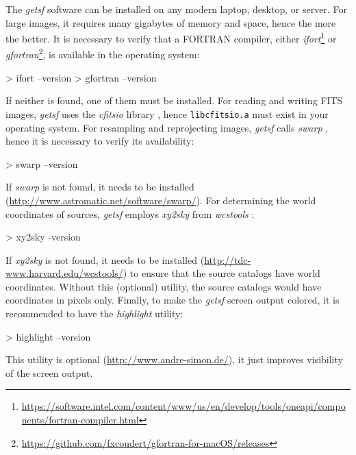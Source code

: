 \documentclass[a4paper,10pt]{article}
\begin{document}
The \textsl{getsf} software can be installed on any modern laptop, desktop, or server. For large images, it requires many gigabytes
of memory and space, hence the more the better. It is necessary to verify that a FORTRAN compiler, either
\textsl{ifort}\footnote{\url{https://software.intel.com/content/www/us/en/develop/tools/oneapi/components/fortran-compiler.html}}
or \textsl{gfortran}\footnote{\url{https://github.com/fxcoudert/gfortran-for-macOS/releases}}, is available in the operating system:
\begin{verbnobox}[\mbox{}\small] 
> ifort --version
> gfortran --version
\end{verbnobox} 
If neither is found, one of them must be installed. For reading and writing FITS images, \textsl{getsf} uses the \textsl{cfitsio}
library \citep{Pence1999}, hence \verb!libcfitsio.a! must exist in your operating system. For resampling and reprojecting images,
\textsl{getsf} calls \textsl{swarp} \citep{Bertin_etal2002}, hence it is necessary to verify its availability:
\begin{verbnobox}[\mbox{}\small] 
> swarp --version
\end{verbnobox} 
If \textsl{swarp} is not found, it needs to be installed (\url{http://www.astromatic.net/software/swarp/}). For determining the
world coordinates of sources, \textsl{getsf} employs \textsl{xy2sky} from \textsl{wcstools} \citep{Mink2002}:
\begin{verbnobox}[\mbox{}\small] 
> xy2sky -version
\end{verbnobox} 
If \textsl{xy2sky} is not found, it needs to be installed (\url{http://tdc-www.harvard.edu/wcstools/}) to ensure that the source
catalogs have world coordinates. Without this (optional) utility, the source catalogs would have coordinates in pixels only.
Finally, to make the \textsl{getsf} screen output colored, it is recommended to have the \textsl{highlight} utility:
\begin{verbnobox}[\mbox{}\small] 
> highlight --version
\end{verbnobox} 
This utility is optional (\url{http://www.andre-simon.de/}), it just improves visibility of the screen output.
\end{document}
